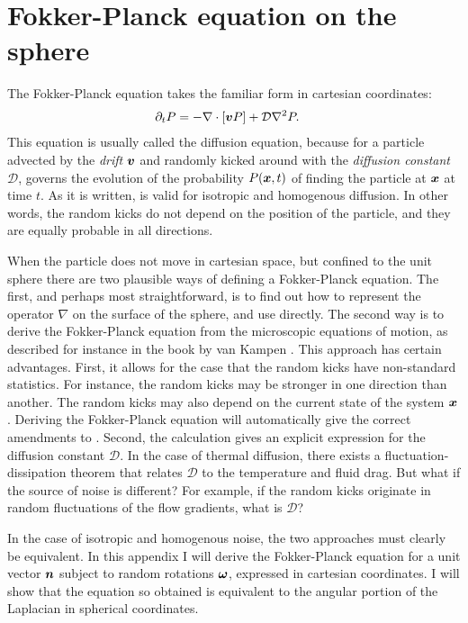 \documentclass[thesis.tex]{subfiles}
\begin{document}
\chapter{Fokker-Planck equation on the sphere}\label{sec:fpesphere}

The Fokker-Planck equation takes the familiar form in cartesian coordinates:
\begin{align}
	\partial_t P &= -\nabla \cdot [\ve v P] + \mathcal D \nabla^2 P.\eqnlab{diffusion}
\end{align}
This equation is usually called the diffusion equation, because for a particle advected by the \emph{drift} $\mbox{\boldmath$v$}$ and randomly kicked around with the \emph{diffusion constant} $\mathcal D$,  governs the evolution of the probability $P(\mbox{\boldmath$x$},t)$ of finding the particle at $\mbox{\boldmath$x$}$ at time $t$. As it is written,  is valid for isotropic and homogenous diffusion. In other words, the random kicks do not depend on the position of the particle, and they are equally probable in all directions. 

When the particle does not move in cartesian space, but confined to the unit sphere there are two plausible ways of defining a Fokker-Planck equation. The first, and perhaps most straightforward, is to find out how to represent the operator $\nabla$ on the surface of the sphere, and use  directly. The second way is to derive the Fokker-Planck equation from the microscopic equations of motion, as described for instance in the book by van Kampen \cite{kampen2007}. This approach has certain advantages. First, it allows for the case that the random kicks have non-standard statistics. For instance, the random kicks may be stronger in one direction than another. The random kicks may also depend on the current state of the system $\mbox{\boldmath$x$}$. Deriving the Fokker-Planck equation will automatically give the correct amendments to . Second, the calculation gives an explicit expression for the diffusion constant $\mathcal D$. In the case of thermal diffusion, there exists a fluctuation-dissipation theorem that relates $\mathcal D$ to the temperature and fluid drag. But what if the source of noise is different? For example, if the random kicks originate in random fluctuations of the flow gradients, what is $\mathcal D$?

In the case of isotropic and homogenous noise, the two approaches must clearly be equivalent. In this appendix I will derive the Fokker-Planck equation for a unit vector $\mbox{\boldmath$n$}$ subject to random rotations $\mbox{\boldmath$\omega$}$, expressed in cartesian coordinates. I will show that the equation so obtained is equivalent to the angular portion of the Laplacian in spherical coordinates. 
\end{document}

